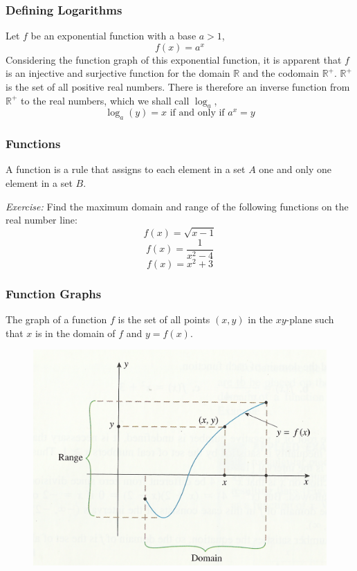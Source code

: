 \documentclass[xcolor=dvipsnames]{beamer}
\begin{document}
\begin{frame}
  \frametitle{Defining Logarithms}
Let $f$ be an exponential function with a base $a>1$,
\begin{equation}
  \label{eq:ohzuiwah}
  f(x)=a^{x}
\end{equation}
Considering the function graph of this exponential function, it is
apparent that $f$ is an injective and surjective function for the
domain $\mathbb{R}$ and the codomain $\mathbb{R}^{+}$.
$\mathbb{R}^{+}$ is the set of all positive real numbers. There is
therefore an inverse function from $\mathbb{R}^{+}$ to the real
numbers, which we shall call $\log_{a}$,
\begin{equation}
  \label{eq:cievucha}
  \log_{a}(y)=x\mbox{ if and only if }a^{x}=y
\end{equation}
\end{frame}

\begin{frame}
  \frametitle{Functions}
A \alert{function} is a rule that assigns to each element in a set $A$ one and
only one element in a set $B$.

\medskip

\emph{Exercise:} Find the maximum domain and range of the following
functions on the real number line:
\begin{equation}
  \label{eq:sijoomai}
  f(x)=\sqrt{x-1}
\end{equation}
\begin{equation}
  \label{eq:vooghahk}
  f(x)=\frac{1}{x^{2}-4}
\end{equation}
\begin{equation}
  \label{eq:zaekohxi}
  f(x)=x^{2}+3
\end{equation}
\end{frame}

\begin{frame}
  \frametitle{Function Graphs}
The \alert{graph of a function} $f$ is the set of all points $(x,y)$
in the $xy$-plane such that $x$ is in the domain of $f$ and $y=f(x)$.
  \begin{figure}[h]
    \includegraphics[scale=1]{./diagrams/fgraph-02.png}
  \end{figure}
\end{frame}
\end{document}
